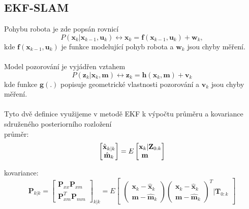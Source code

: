 \documentclass[11pt]{article}
\begin{document}
\subsection{EKF-SLAM}
Pohybu robota je zde popsán rovnicí
\begin{equation}
	P(\textbf{x}_k|\textbf{x}_{k-1},\textbf{u}_k)\leftrightarrow \textbf{x}_k=\textbf{f}(\textbf{x}_{k-1},\textbf{u}_k)+\textbf{w}_k,
\end{equation} 
kde $\textbf{f}(\textbf{x}_{k-1},\textbf{u}_k)$ je funkce modelující pohyb robota a $\textbf{w}_k$ jsou chyby měření.\\
\\
Model pozorování je vyjádřen vztahem
\begin{equation}
	P(\textbf{z}_k|\textbf{x}_k,\textbf{m})\leftrightarrow \textbf{z}_k=\textbf{h}(\textbf{x}_k,\textbf{m})+\textbf{v}_k
\end{equation}
kde funkce $\textbf{g}(.)$ popisuje geometrické vlastnosti pozorování a $\textbf{v}_k$ jsou chyby měření.\\
\\
Tyto dvě definice využijeme v metodě EKF k výpočtu průměru a kovariance sdruženého posteriorního rozložení\\
\indent průměr:
\begin{equation}
	\begin{bmatrix}
	\hat{\textbf{x}}_{k|k}\\\hat{\textbf{m}}_k
	\end{bmatrix}=E
	\begin{bmatrix}
	\textbf{x}_k |\textbf{Z}_{0:k}\\\textbf{m}\indent
	\end{bmatrix}
\end{equation}

\indent kovariance:
\begin{equation}
	\textbf{P}_{k|k}=\begin{bmatrix}
	\textbf{P}_{xx} \textbf{P}_{xm}\\\textbf{P}^T_{xm} \textbf{P}_{mm}
	\end{bmatrix}_{k|k}=E\begin{bmatrix}
	\begin{pmatrix}
	\textbf{x}_k-\hat{\textbf{x}}_k\\\textbf{m}-\hat{\textbf{m}}_k
	\end{pmatrix} \begin{pmatrix}
	\textbf{x}_k-\hat{\textbf{x}}_k\\\textbf{m}-\hat{\textbf{m}}_k
	\end{pmatrix}^T |\textbf{T}_{0:k}
	\end{bmatrix}
\end{equation}
\end{document}

